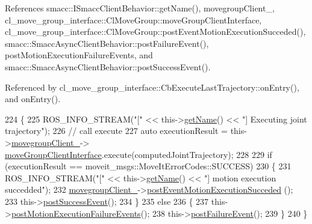 References smacc\+::\+I\+Smacc\+Client\+Behavior\+::get\+Name(), movegroup\+Client\+\_\+, cl\+\_\+move\+\_\+group\+\_\+interface\+::\+Cl\+Move\+Group\+::move\+Group\+Client\+Interface, cl\+\_\+move\+\_\+group\+\_\+interface\+::\+Cl\+Move\+Group\+::post\+Event\+Motion\+Execution\+Succeded(), smacc\+::\+Smacc\+Async\+Client\+Behavior\+::post\+Failure\+Event(), post\+Motion\+Execution\+Failure\+Events, and smacc\+::\+Smacc\+Async\+Client\+Behavior\+::post\+Success\+Event().



Referenced by cl\+\_\+move\+\_\+group\+\_\+interface\+::\+Cb\+Execute\+Last\+Trajectory\+::on\+Entry(), and on\+Entry().


\begin{DoxyCode}
224     \{
225         ROS\_INFO\_STREAM(\textcolor{stringliteral}{"["} << this->\hyperlink{classsmacc_1_1ISmaccClientBehavior_a18e4bec9460b010f2894c0f7e7064a34}{getName}() << \textcolor{stringliteral}{"] Executing joint trajectory"});
226         \textcolor{comment}{// call execute}
227         \textcolor{keyword}{auto} executionResult = this->\hyperlink{classcl__move__group__interface_1_1CbMoveEndEffectorTrajectory_aea650d3e7836125b32be97392b71a7f3}{movegroupClient\_}->
      \hyperlink{classcl__move__group__interface_1_1ClMoveGroup_a92922ea689e4e1b7b91512c56629c95b}{moveGroupClientInterface}.execute(computedJointTrajectory);
228 
229         \textcolor{keywordflow}{if} (executionResult == moveit\_msgs::MoveItErrorCodes::SUCCESS)
230         \{
231             ROS\_INFO\_STREAM(\textcolor{stringliteral}{"["} << this->\hyperlink{classsmacc_1_1ISmaccClientBehavior_a18e4bec9460b010f2894c0f7e7064a34}{getName}() << \textcolor{stringliteral}{"] motion execution succedded"});
232             \hyperlink{classcl__move__group__interface_1_1CbMoveEndEffectorTrajectory_aea650d3e7836125b32be97392b71a7f3}{movegroupClient\_}->\hyperlink{classcl__move__group__interface_1_1ClMoveGroup_aebaf269db373d41837bae87651458e54}{postEventMotionExecutionSucceded}
      ();
233             this->\hyperlink{classsmacc_1_1SmaccAsyncClientBehavior_adf18efe1f0e4eacc1277b8865a8a94b1}{postSuccessEvent}();
234         \}
235         \textcolor{keywordflow}{else}
236         \{
237             this->\hyperlink{classcl__move__group__interface_1_1CbMoveEndEffectorTrajectory_a72c4a469b70617dc5ea75e225a013582}{postMotionExecutionFailureEvents}();
238             this->\hyperlink{classsmacc_1_1SmaccAsyncClientBehavior_af6fa358cb1ab5ed16791a201f59260e0}{postFailureEvent}();
239         \}
240     \}
\end{DoxyCode}
